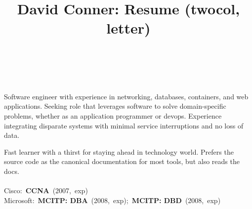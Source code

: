 \documentclass[10pt,letterpaper]{article}
\date{}
\title{David Conner: Resume (twocol, letter)}
\begin{document}
\pagestyle{fancy}
\begin{minipage}[t]{0.490\textwidth}
\vspace{\spread} 
\label{sec:orge25ee0c}

\hspace{-0.25\linewidth}\colorbox{bgcol}{}
\setlength{\parindent}{5mm}

\vspace{-0.1cm}\\
\small{Software engineer with experience in networking, databases, containers,
and web applications. Seeking role that leverages software to solve domain-specific
problems, whether as an application programmer or devops. Experience integrating
disparate systems with minimal service interruptions and no loss of data.}

\small{Fast learner with a thirst for staying ahead in technology world.
Prefers the source code as the canonical documentation for most tools, but
also reads the docs.}
\vspace{\spread}\\
\cvrule{0pt}{0pt}\\
\setlength{\parindent}{0mm}
\small{\textsf{Cisco:}\ \textbf{CCNA}\ (2007,\ exp)}\\
\small{\textsf{Microsoft:}\ \textbf{MCITP: DBA}\ (2008,\ exp);\ \textbf{MCITP: DBD}\ (2008,\ exp)}
\setlength{\parindent}{5mm}

\end{minipage}
\hfill
\end{document}
